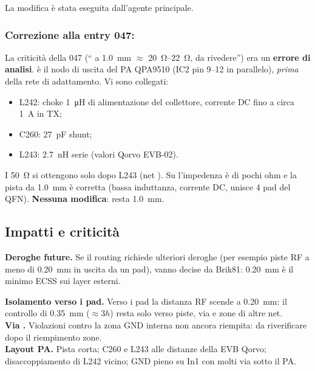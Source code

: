 La modifica è stata eseguita dall'agente principale.

\subsubsection*{Correzione alla entry 047: }
La criticità della 047 (`` a \SI{1,0}{\milli\metre} $\approx$ \SIrange{20}{22}{\ohm}, da rivedere'') era un \textbf{errore di analisi}.  è il nodo di uscita del PA QPA9510 (IC2 pin 9--12 in parallelo), \emph{prima} della rete di adattamento. Vi sono collegati:
\begin{itemize}
  \item L242: choke \SI{1}{\micro\henry} di alimentazione del collettore, corrente DC fino a circa \SI{1}{\ampere} in TX;
  \item C260: \SI{27}{\pico\farad} shunt;
  \item L243: \SI{2,7}{\nano\henry} serie (valori Qorvo EVB-02).
\end{itemize}
I \SI{50}{\ohm} si ottengono solo dopo L243 (net ). Su  l'impedenza è di pochi ohm e la pista da \SI{1,0}{\milli\metre} è corretta (bassa induttanza, corrente DC, unisce 4 pad del QFN). \textbf{Nessuna modifica}:  resta \SI{1,0}{\milli\metre}.

\subsection{Impatti e criticità}
\begin{critbox}
\textbf{Deroghe future.} Se il routing richiede ulteriori deroghe (per esempio piste RF a meno di \SI{0,20}{\milli\metre} in uscita da un pad), vanno decise da Brik81: \SI{0,20}{\milli\metre} è il minimo ECSS sui layer esterni.
\end{critbox}
\begin{notebox}
\textbf{Isolamento verso i pad.} Verso i pad la distanza RF scende a \SI{0,20}{\milli\metre}: il controllo di \SI{0,35}{\milli\metre} ($\approx 3h$) resta solo verso piste, via e zone di altre net.\\
\textbf{Via .} Violazioni contro la zona GND interna non ancora riempita: da riverificare dopo il riempimento zone.\\
\textbf{Layout PA.} Pista  corta; C260 e L243 alle distanze della EVB Qorvo; disaccoppiamento di L242 vicino; GND pieno su In1 con molti via sotto il PA.
\end{notebox}

